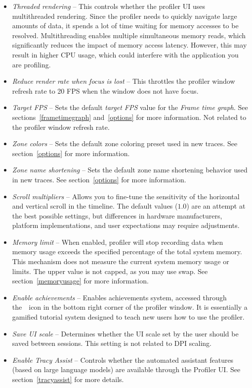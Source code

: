 \documentclass[hidelinks,titlepage,a4paper,twoside]{article}
\begin{document}
\begin{itemize}
\item \emph{Threaded rendering} -- This controls whether the profiler UI uses multithreaded rendering. Since the profiler needs to quickly navigate large amounts of data, it spends a lot of time waiting for memory accesses to be resolved. Multithreading enables multiple simultaneous memory reads, which significantly reduces the impact of memory access latency. However, this may result in higher CPU usage, which could interfere with the application you are profiling.
\item \emph{Reduce render rate when focus is lost} -- This throttles the profiler window refresh rate to 20 FPS when the window does not have focus.
\item \emph{Target FPS} -- Sets the default \emph{target FPS} value for the \emph{Frame time graph}. See sections~\ref{frametimegraph} and~\ref{options} for more information. Not related to the profiler window refresh rate.
\item \emph{Zone colors} -- Sets the default zone coloring preset used in new traces. See section~\ref{options} for more information.
\item \emph{Zone name shortening} -- Sets the default zone name shortening behavior used in new traces. See section~\ref{options} for more information.
\item \emph{Scroll multipliers} -- Allows you to fine-tune the sensitivity of the horizontal and vertical scroll in the timeline. The default values ($1.0$) are an attempt at the best possible settings, but differences in hardware manufacturers, platform implementations, and user expectations may require adjustments.
\item \emph{Memory limit} -- When enabled, profiler will stop recording data when memory usage exceeds the specified percentage of the total system memory. This mechanism does not measure the current system memory usage or limits. The upper value is not capped, as you may use swap. See section~\ref{memoryusage} for more information.
\item \emph{Enable achievements} -- Enables achievements system, accessed through the~\faStar{}~icon in the bottom right corner of the profiler window. It is essentially a gamified tutorial system designed to teach new users how to use the profiler.
\item \emph{Save UI scale} -- Determines whether the UI scale set by the user should be saved between sessions. This setting is not related to DPI scaling.
\item \emph{Enable Tracy Assist} -- Controls whether the automated assistant features (based on large language models) are available through the Profiler UI. See section~\ref{tracyassist} for more details.
\end{itemize}
\end{document}
